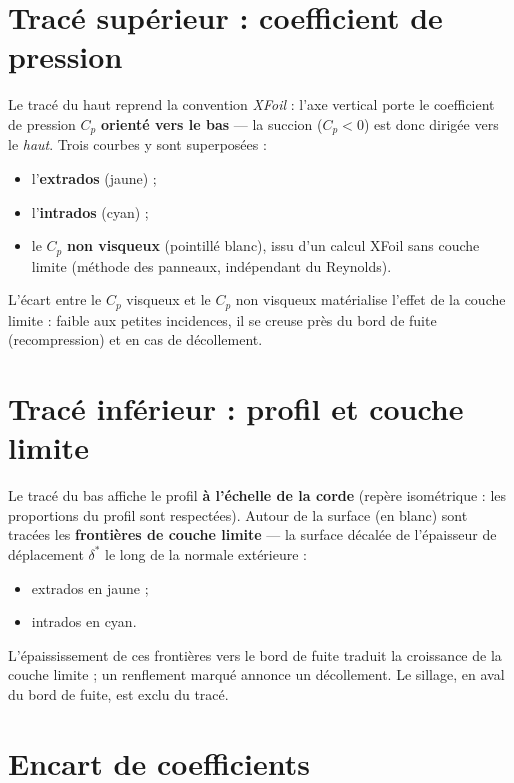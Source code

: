 \section{Tracé supérieur : coefficient de pression}

Le tracé du haut reprend la convention \emph{XFoil} : l'axe vertical
porte le coefficient de pression $C_p$ \textbf{orienté vers le bas}
— la succion ($C_p < 0$) est donc dirigée vers le \emph{haut}. Trois
courbes y sont superposées :

\begin{itemize}
    \item l'\textbf{extrados} (jaune) ;
    \item l'\textbf{intrados} (cyan) ;
    \item le $C_p$ \textbf{non visqueux} (pointillé blanc), issu d'un
        calcul XFoil sans couche limite (méthode des panneaux,
        indépendant du Reynolds).
\end{itemize}

L'écart entre le $C_p$ visqueux et le $C_p$ non visqueux matérialise
l'effet de la couche limite : faible aux petites incidences, il se
creuse près du bord de fuite (recompression) et en cas de
décollement.

\section{Tracé inférieur : profil et couche limite}

Le tracé du bas affiche le profil \textbf{à l'échelle de la corde}
(repère isométrique : les proportions du profil sont respectées).
Autour de la surface (en blanc) sont tracées les \textbf{frontières de
couche limite} — la surface décalée de l'épaisseur de déplacement
$\delta^*$ le long de la normale extérieure :

\begin{itemize}
    \item extrados en jaune ;
    \item intrados en cyan.
\end{itemize}

L'épaississement de ces frontières vers le bord de fuite traduit la
croissance de la couche limite ; un renflement marqué annonce un
décollement. Le sillage, en aval du bord de fuite, est exclu du tracé.

\section{Encart de coefficients}

